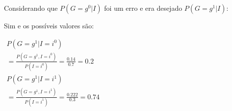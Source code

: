Considerando que $P(G=g^0|I)$ foi um erro e era desejado $P(G=g^1|I)$:

Sim e os possíveis valores são:

$\begin{array}{l}
\displaystyle P(G = {g^1}|I = {i^0})\\
\displaystyle = \frac{{P(G = {g^1},I = {i^0})}}{{P(I = {i^0})}} = \frac{{0.14}}{{0.7}} = 0.2\\
\displaystyle P(G = {g^1}|I = {i^1})\\
\displaystyle = \frac{{P(G = {g^1},I = {i^1})}}{{P(I = {i^1})}} = \frac{{0.222}}{{0.3}} = 0.74
\end{array}$